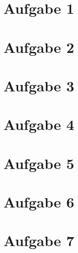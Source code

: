 \documentclass{article}
\begin{document}
  
\section*{Aufgabe 1}


\section*{Aufgabe 2}

  
\section*{Aufgabe 3}
  

\section*{Aufgabe 4}


\section*{Aufgabe 5}


\section*{Aufgabe 6}

\newpage

\section*{Aufgabe 7}

  
\end{document}
